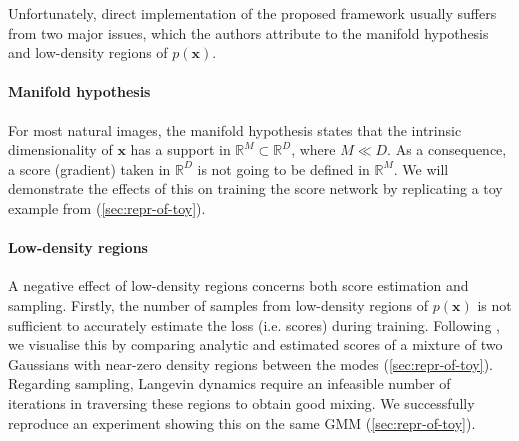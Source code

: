 Unfortunately, direct implementation of the proposed framework usually suffers from two major issues, which the authors attribute to the manifold hypothesis and low-density regions of $p(\mathbf{x})$. 

\paragraph{Manifold hypothesis} For most natural images, the manifold hypothesis states that the intrinsic dimensionality of $\mathbf{x}$ has a support in $\mathbb{R}^M \subset \mathbb{R}^D$, where $M \ll D$. As a consequence, a score (gradient) taken in $\mathbb{R}^D$ is not going to be defined in $\mathbb{R}^M$. We will demonstrate the effects of this on training the score network by replicating a toy example from \cite{ncsn-paper} (\autoref{sec:repr-of-toy}).

\paragraph{Low-density regions} A negative effect of low-density regions concerns both score estimation and sampling. 
Firstly, the number of samples from low-density regions of $p(\mathbf{x})$ is not sufficient to accurately estimate the loss (i.e. scores) during training. Following \cite{ncsn-paper}, we visualise this by comparing analytic and estimated scores of a mixture of two Gaussians with near-zero density regions between the modes (\autoref{sec:repr-of-toy}).
Regarding sampling, Langevin dynamics require an infeasible number of iterations in traversing these regions to obtain good mixing. We successfully reproduce an experiment showing this on the same GMM (\autoref{sec:repr-of-toy}).

